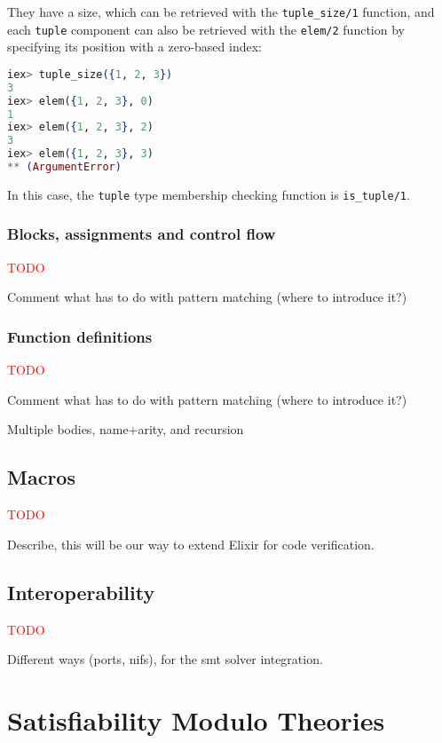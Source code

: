 They have a size, which can be retrieved with the \verb|tuple_size/1| function,
and each \verb|tuple| component can also be retrieved with the \verb|elem/2|
function by specifying its position with a zero-based index:

\begin{lstlisting}[language=elixir,numbers=none,frame=none]
iex> tuple_size({1, 2, 3})
3
iex> elem({1, 2, 3}, 0)
1
iex> elem({1, 2, 3}, 2)
3
iex> elem({1, 2, 3}, 3)
** (ArgumentError)
\end{lstlisting}

In this case, the \verb|tuple| type membership checking function is
\verb|is_tuple/1|.

\subsubsection{Blocks, assignments and control flow}

\textcolor{red}{TODO}

Comment what has to do with pattern matching (where to introduce it?)

\subsubsection{Function definitions}

\textcolor{red}{TODO}

Comment what has to do with pattern matching (where to introduce it?)

Multiple bodies, name+arity, and recursion

\subsection{Macros}

\textcolor{red}{TODO}

Describe, this will be our way to extend Elixir for code verification.

\subsection{Interoperability}

\textcolor{red}{TODO}

Different ways (ports, \gls{nif}s), for the \acrshort{smt} solver integration.

\section{Satisfiability Modulo Theories}

